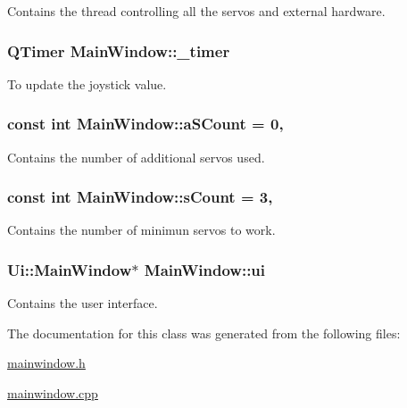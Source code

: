 Contains the thread controlling all the servos and external hardware. 

\hypertarget{class_main_window_a254b03b878cfda75c1c411a2f8568d33}{}
\subsubsection[{\+\_\+timer}]{\setlength{\rightskip}{0pt plus 5cm}Q\+Timer Main\+Window\+::\+\_\+timer\hspace{0.3cm}{\ttfamily [private]}}\label{class_main_window_a254b03b878cfda75c1c411a2f8568d33}


To update the joystick value. 

\hypertarget{class_main_window_a42c44af9c0eebc33f4e81f02e15b0461}{}
\subsubsection[{a\+S\+Count}]{\setlength{\rightskip}{0pt plus 5cm}const int Main\+Window\+::a\+S\+Count = 0\hspace{0.3cm}{\ttfamily [static]}, {\ttfamily [private]}}\label{class_main_window_a42c44af9c0eebc33f4e81f02e15b0461}


Contains the number of additional servos used. 

\hypertarget{class_main_window_a646727b1c45c72638325adfd460649c0}{}
\subsubsection[{s\+Count}]{\setlength{\rightskip}{0pt plus 5cm}const int Main\+Window\+::s\+Count = 3\hspace{0.3cm}{\ttfamily [static]}, {\ttfamily [private]}}\label{class_main_window_a646727b1c45c72638325adfd460649c0}


Contains the number of minimun servos to work. 

\hypertarget{class_main_window_a35466a70ed47252a0191168126a352a5}{}
\subsubsection[{ui}]{\setlength{\rightskip}{0pt plus 5cm}Ui\+::\+Main\+Window$\ast$ Main\+Window\+::ui\hspace{0.3cm}{\ttfamily [private]}}\label{class_main_window_a35466a70ed47252a0191168126a352a5}


Contains the user interface. 



The documentation for this class was generated from the following files\+:\begin{DoxyCompactItemize}
\item 
\hyperlink{mainwindow_8h}{mainwindow.\+h}\item 
\hyperlink{mainwindow_8cpp}{mainwindow.\+cpp}\end{DoxyCompactItemize}
